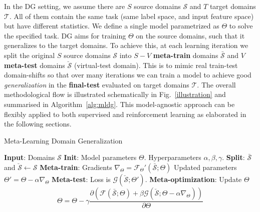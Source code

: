 \documentclass[letterpaper]{article} \usepackage{aaai18}  \usepackage{times}  \usepackage{helvet}  \usepackage{courier}  \usepackage{url}  \usepackage{graphicx}  \usepackage{amsmath}
\begin{document}
In the DG setting, we assume there are $S$ source domains $\mathcal{S}$ and $T$ target domains $\mathcal{T}$. All of them contain the same task (same label space, and input feature space) but have different statistics. 
We define a single model parametrized as $\Theta$ to solve the specified task. DG aims for training $\Theta$ on the source domains, such that it generalizes to the target domains. To achieve this, at each learning iteration we split the original $S$ source domains $\mathcal{S}$ into $S-V$ \textbf{meta-train} domains $\bar{\mathcal{S}}$ and $V$ \textbf{meta-test} domains $\breve{\mathcal{S}}$ (virtual-test domain). This is to mimic real train-test domain-shifts so that over many iterations we can train a model to achieve good \textit{generalization} in the \textbf{final-test} evaluated on target domains $\mathcal{T}$. The overall methodological flow is illustrated schematically in Fig.~\ref{illustration} and summarised in Algorithm~\ref{alg:mldg}. This model-agnostic approach can be flexibly applied to both supervised and reinforcement learning as elaborated in the following sections.

\begin{algorithm}[t]
   \caption{Meta-Learning Domain Generalization}\label{alg:mldg}
\begin{algorithmic}[1]
\State \textbf{Input}: Domains $\mathcal{S}$
\State \textbf{Init}: Model parameters $\Theta$.  Hyperparameters $\alpha,\beta,\gamma$.
\State \textbf{Split}: $\bar{\mathcal{S}}$ and $\breve{\mathcal{S}} \gets \mathcal{S}$ 
\State \textbf{Meta-train}: Gradients $\nabla_{\Theta} = \mathcal{F}_{\Theta}'( \bar{\mathcal{S}}; \Theta)$
\State Updated parameters $\Theta'=\Theta-\alpha \nabla_{\Theta}$ \State \textbf{Meta-test}: Loss is $\mathcal{G}(\breve{\mathcal{S}}; \Theta')$.
\State \textbf{Meta-optimization}: Update $\Theta$
$$
\Theta = \Theta - \gamma \frac{\partial (\mathcal{F}(\bar{\mathcal{S}}; \Theta) + \beta \mathcal{G}(\breve{\mathcal{S}}; \Theta - \alpha \nabla_\Theta))}{\partial \Theta}
$$


\EndFor
\EndProcedure
\end{algorithmic}
  \end{algorithm}
\end{document}

